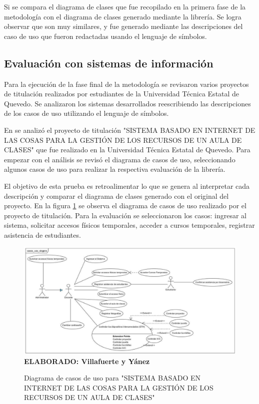 \begin{itemize}
\end{itemize}

Si se compara el diagrama de clases que fue recopilado en la primera fase de la metodología con el diagrama de clases generado mediante la librería. Se logra observar que son muy similares, y fue generado mediante las descripciones del caso de uso que fueron redactadas usando el lenguaje de símbolos.

\subsection{Evaluación con sistemas de información}

Para la ejecución de la fase final de la metodología se revisaron varios proyectos de titulación realizados por estudiantes de la Universidad Técnica Estatal de Quevedo. Se analizaron los sistemas desarrollados reescribiendo las descripciones de los casos de uso utilizando el lenguaje de símbolos.

En \cite{Villafuerte2020} se analizó el proyecto de titulación "SISTEMA BASADO EN INTERNET DE LAS COSAS PARA LA GESTIÓN DE LOS RECURSOS DE UN AULA DE CLASES" que fue realizado en la Universidad Técnica Estatal de Quevedo. Para empezar con el análisis se revisó el diagrama de casos de uso, seleccionando algunos casos de uso para realizar la respectiva evaluación de la librería. 

El objetivo de esta prueba es retroalimentar lo que se genera al interpretar cada descripción y comparar el diagrama de clases generado con el original del proyecto. En la figura \ref{fig:dcu_aula_inteligente} se observa el diagrama de casos de uso realizado por el proyecto de titulación. Para la evaluación se seleccionaron los casos: ingresar al sistema, solicitar accesos físicos temporales, acceder a cursos temporales, registrar asistencia de estudiantes.

\begin{figure}[h!]
	\caption{Diagrama de casos de uso para "SISTEMA BASADO EN INTERNET DE LAS COSAS PARA LA GESTIÓN DE LOS RECURSOS DE UN AULA DE CLASES"}
	\includegraphics[width=13cm]{img/dgcu-aula-int.png}
	\label{fig:dcu_aula_inteligente}
	\textbf{\\ ELABORADO: Villafuerte y Yánez}
\end{figure}

